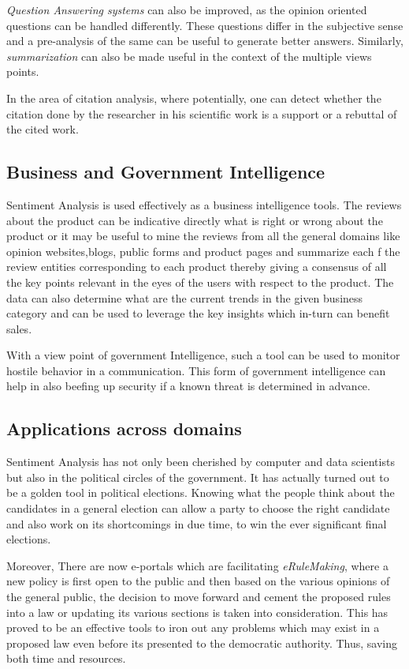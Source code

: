 \textit{Question Answering systems} can also be improved, as the opinion oriented questions can be handled differently. These questions differ in the subjective sense and a pre-analysis of the same can be useful to generate better answers. Similarly, \textit{summarization} can also be made useful in the context of the multiple views points.  

In the area of citation analysis, where potentially, one can detect whether the citation done by the researcher in his scientific work is a support or a rebuttal of the cited work.

\subsection{Business and Government Intelligence}
Sentiment Analysis is used effectively as a business intelligence tools. The reviews about the product can be indicative directly what is right or wrong about the product or it may be useful to mine the reviews from all the general domains like opinion websites,blogs, public forms and product pages and summarize each f the review entities corresponding to each product thereby giving a consensus of all the key points relevant in the eyes of the users with respect to the product. The data can also determine what are the current trends in the given business category and can be used to leverage the key insights which in-turn can benefit sales.  

With a view point of government  Intelligence, such a tool can be used to monitor hostile behavior in a communication. This form of government intelligence can help in also beefing up security if a known threat is determined in advance.

\subsection{Applications across domains}
Sentiment Analysis has not only been cherished by computer and data scientists but also in the political circles of the government. It has actually turned out to be a golden tool in political elections. Knowing what the people think about the candidates in a general election can allow a party to choose the right candidate and also work on its shortcomings in due time, to win the ever significant final elections. 

Moreover, There are now e-portals which are facilitating \textit{eRuleMaking}, where a new policy is first open to the public and then based on the various opinions of the general public, the decision to move forward and cement the proposed rules into a law or updating its various sections is taken into consideration. This has proved to be an effective tools to iron out any problems which may exist in a proposed law even before its presented to the democratic authority. Thus, saving both time and resources.

